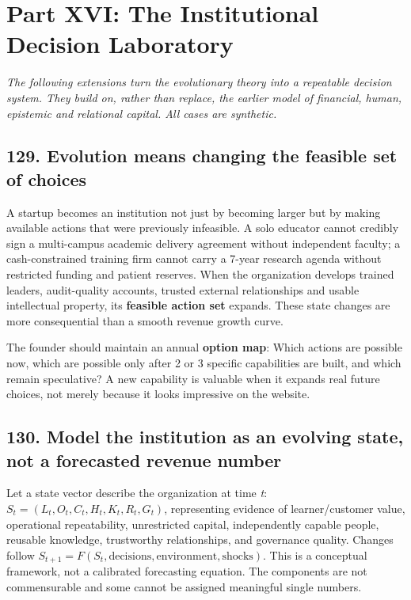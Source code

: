 
\section*{Part XVI: The Institutional Decision Laboratory}

\textit{The following extensions turn the evolutionary theory into a repeatable decision system. They build on, rather than replace, the earlier model of financial, human, epistemic and relational capital. All cases are synthetic.}

\subsection{129. Evolution means changing the feasible set of choices}

A startup becomes an institution not just by becoming larger but by making available actions that were previously infeasible. A solo educator cannot credibly sign a multi-campus academic delivery agreement without independent faculty; a cash-constrained training firm cannot carry a 7-year research agenda without restricted funding and patient reserves. When the organization develops trained leaders, audit-quality accounts, trusted external relationships and usable intellectual property, its \textbf{feasible action set} expands. These state changes are more consequential than a smooth revenue growth curve.

The founder should maintain an annual \textbf{option map}: Which actions are possible now, which are possible only after 2 or 3 specific capabilities are built, and which remain speculative? A new capability is valuable when it expands real future choices, not merely because it looks impressive on the website.

\subsection{130. Model the institution as an evolving state, not a forecasted revenue number}

Let a state vector describe the organization at time \textit{t}: $S_t = (L_t, O_t, C_t, H_t, K_t, R_t, G_t)$, representing evidence of learner/\allowbreak customer value, operational repeatability, unrestricted capital, independently capable people, reusable knowledge, trustworthy relationships, and governance quality. Changes follow $S_{t+1} = F(S_t, \text{decisions}, \text{environment}, \text{shocks})$. This is a conceptual framework, not a calibrated forecasting equation. The components are not commensurable and some cannot be assigned meaningful single numbers.

